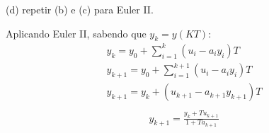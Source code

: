 \documentclass[10pt]{article}
\begin{document}
(d) repetir (b) e (c) para Euler II.

Aplicando Euler II, sabendo que $ y_k = y(KT) $:
\begin{align*}
    y_k = y_0 + \sum_{i=1}^{k} (u_i - a_i y_i)T\\
    y_{k+1} = y_0 + \sum_{i=1}^{k+1} (u_i - a_i y_i)T\\
    y_{k+1} = y_k + (u_{k+1} - a_{k+1} y_{k+1})T\\
\end{align*}
\begin{align*}
    y_{k+1} = \frac{y_k + Tu_{k+1}}{1 + Ta_{k+1}}
\end{align*}
\end{document}
